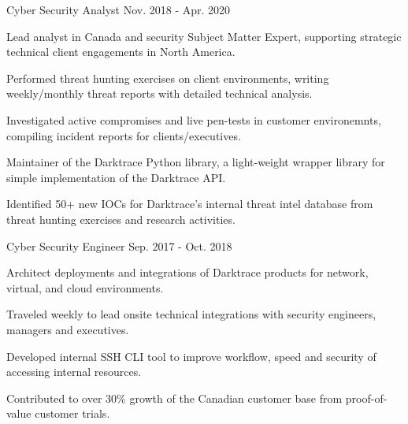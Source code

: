 \begin{cventries}
  \cventry
    {Cyber Security Analyst} %
    {} %
    {} %
    {Nov. 2018 - Apr. 2020} %
    {
      \begin{cvitems} %
        \item {Lead analyst in Canada and security Subject Matter Expert, supporting strategic technical client engagements in North America.}
        \item {Performed threat hunting exercises on client environments, writing weekly/monthly threat reports with detailed technical analysis.}
        \item {Investigated active compromises and live pen-tests in customer environemnts, compiling incident reports for clients/executives.}
        \item {Maintainer of the Darktrace Python library, a light-weight wrapper library for simple implementation of the Darktrace API.}
        \item {Identified 50+ new IOCs for Darktrace's internal threat intel database from threat hunting exercises and research activities.}
      \end{cvitems}
    }

  \cventry
    {Cyber Security Engineer} %
    {} %
    {} %
    {Sep. 2017 - Oct. 2018} %
    {
      \begin{cvitems} %
        \item {Architect deployments and integrations of Darktrace products for network, virtual, and cloud environments.}
        \item {Traveled weekly to lead onsite technical integrations with security engineers, managers and executives.}
        \item {Developed internal SSH CLI tool to improve workflow, speed and security of accessing internal resources.}
        \item {Contributed to over 30\% growth of the Canadian customer base from proof-of-value customer trials.}
      \end{cvitems}
    }


\end{cventries}
